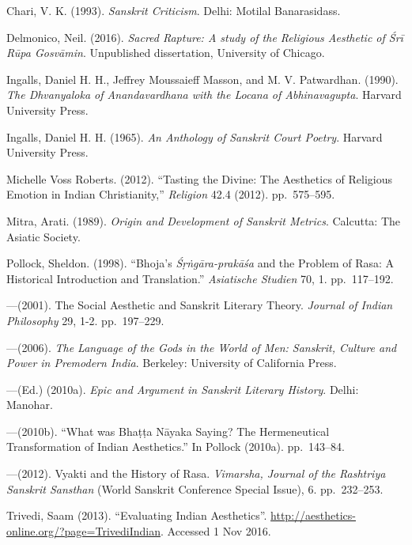 \begin{thebibliography}{99}
\itemsep=2pt
Chari, V. K. (1993). \textsl{Sanskrit Criticism}. Delhi: Motilal Banarasidass.

Delmonico, Neil. (2016). \textsl{Sacred Rapture: A study of the Religious Aesthetic of Śrī Rūpa Gosvāmin}. Unpublished dissertation, University of Chicago.

Ingalls, Daniel H. H., Jeffrey Moussaieff Masson, and M. V. Patwardhan. (1990). \textsl{The Dhvanyaloka of Anandavardhana with the Locana of Abhinavagupta}. Harvard University Press.

Ingalls, Daniel H. H. (1965). \textsl{An Anthology of Sanskrit Court Poetry}. Harvard University Press.

Michelle Voss Roberts. (2012). ``Tasting the Divine: The Aesthetics of Religious Emotion in Indian Christianity,'' \textsl{Religion} 42.4 (2012). pp.~575--595.

Mitra, Arati. (1989). \textsl{Origin and Development of Sanskrit Metrics}. Calcutta: The Asiatic Society.

Pollock, Sheldon. (1998). ``Bhoja's \textsl{Śṛṅgāra-prakāśa} and the Problem of Rasa: A Historical Introduction and Translation.'' \textsl{Asiatische Studien} 70, 1. pp.~117--192. 

---\kern3pt(2001). The Social Aesthetic and Sanskrit Literary Theory. \textsl{Journal of Indian Philosophy} 29, 1-2. pp.~197--229.

---\kern3pt(2006). \textsl{The Language of the Gods in the World of Men: Sanskrit, Culture and Power in Premodern India}. Berkeley: University of California Press.

---\kern3pt(Ed.) (2010a). \textsl{Epic and Argument in Sanskrit Literary History}. Delhi: Manohar.

---\kern3pt(2010b). ``What was Bhaṭṭa Nāyaka Saying? The Hermeneutical Transformation of Indian Aesthetics.'' In Pollock (2010a). pp.~143--84.

---\kern3pt(2012). Vyakti and the History of Rasa. \textsl{Vimarsha, Journal of the Rashtriya Sanskrit Sansthan} (World Sanskrit Conference Special Issue), 6. pp.~232--253.

Trivedi, Saam (2013). ``Evaluating Indian Aesthetics''. \url{http://aesthetics-online.org/?page=TrivediIndian}. Accessed 1 Nov 2016.
\end{thebibliography}


\label{chapter\thechapter:end}

